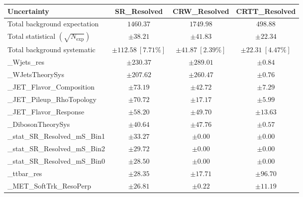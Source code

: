 		\begin{table}
		\centering
		\small
		\begin{tabular*}{\textwidth}{@{\extracolsep{\fill}}lccc}
		\toprule
		\textbf{Uncertainty}                                    & SR\_Resolved            & CRW\_Resolved            & CRTT\_Resolved            \\
		\midrule
		Total background expectation             &  $1460.37$        &  $1749.98$        &  $498.88$       \\
		\midrule
		Total statistical $(\sqrt{N_{\mathrm{exp}}})$              & $\pm 38.21$        & $\pm 41.83$        & $\pm 22.34$       \\
		Total background systematic               & $\pm 112.58\ [7.71\%] $        & $\pm 41.87\ [2.39\%] $        & $\pm 22.31\ [4.47\%] $             \\
		\midrule
		\mu\_Wjets\_res         & $\pm 230.37$          & $\pm 289.01$          & $\pm 0.84$       \\
		\alpha\_WJetsTheorySys         & $\pm 207.62$          & $\pm 260.47$          & $\pm 0.76$       \\
		\alpha\_JET\_Flavor\_Composition         & $\pm 73.19$          & $\pm 42.72$          & $\pm 7.29$       \\
		\alpha\_JET\_Pileup\_RhoTopology         & $\pm 70.72$          & $\pm 17.17$          & $\pm 5.99$       \\
		\alpha\_JET\_Flavor\_Response         & $\pm 58.20$          & $\pm 49.70$          & $\pm 13.63$       \\
		\alpha\_DibosonTheorySys         & $\pm 40.64$          & $\pm 47.76$          & $\pm 0.57$       \\
		\gamma\_stat\_SR\_Resolved\_mS\_Bin1         & $\pm 33.27$          & $\pm 0.00$          & $\pm 0.00$       \\
		\gamma\_stat\_SR\_Resolved\_mS\_Bin2         & $\pm 29.72$          & $\pm 0.00$          & $\pm 0.00$       \\
		\gamma\_stat\_SR\_Resolved\_mS\_Bin0         & $\pm 28.50$          & $\pm 0.00$          & $\pm 0.00$       \\
		\mu\_ttbar\_res         & $\pm 28.35$          & $\pm 17.71$          & $\pm 96.70$       \\
		\alpha\_MET\_SoftTrk\_ResoPerp         & $\pm 26.81$          & $\pm 0.22$          & $\pm 11.19$       \\

\end{tabular*}
\end{table}
